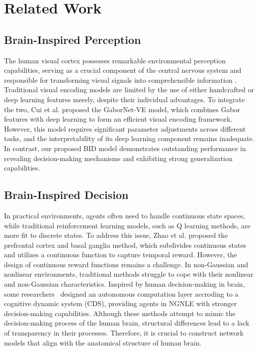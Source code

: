 \section{Related Work}

\subsection{Brain-Inspired Perception}
\hspace{1pc}The human visual cortex possesses remarkable environmental perception capabilities, serving as a crucial component of the central nervous system and responsible for transforming visual signals into comprehensible information \cite{9134376}. 
Traditional visual encoding models are limited by the use of either handcrafted or deep learning features merely, despite their individual advantages\cite{kubilius2019brain}. 
To integrate the two, Cui et al. \cite{8574054} proposed the GaborNet-VE model, which combines Gabor features with deep learning to form an efficient visual encoding framework. 
However, this model requires significant parameter adjustments across different tasks, and the interpretability of its deep learning component remains inadequate\cite{liao2021statistical}. 
In contrast, our proposed BID model demonstrates outstanding performance in revealing decision-making mechanisms and exhibiting strong generalization capabilities.

\subsection{Brain-Inspired Decision}
\hspace{1pc}In practical environments, agents often need to handle continuous state spaces, while traditional reinforcement learning models, such as Q learning methods, are more fit to discrete states\cite{xi2020automatic}. 
To address this issue, Zhao et al. \cite{zhao2018brain} proposed the prefrontal cortex and basal ganglia method, which subdivides continuous states and utilizes a continuous function to capture temporal reward. 
However, the design of continuous reward functions remains a challenge. 
In non-Gaussian and nonlinear environments, traditional methods struggle to cope with their nonlinear and non-Gaussian characteristics\cite{naghshvarianjahromi2020natural}. 
Inspired by human decision-making in brain, some researchers~\cite{dai2013dynamic} designed an autonomous computation layer accroding to a cognitive dynamic system (CDS), providing agents in NGNLE with stronger decision-making capabilities. 
Although these methods attempt to mimic the decision-making process of the human brain, structural differences lead to a lack of transparency in their processes. 
Therefore, it is crucial to construct network models that align with the anatomical structure of human brain.


